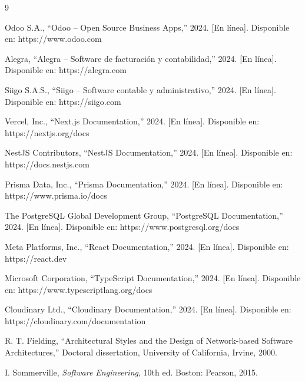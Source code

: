 \documentclass[spanish]{ieee_upb}
\begin{document}
\begin{thebibliography}{9}

	Odoo S.A., ``Odoo -- Open Source Business Apps,'' 2024. [En línea]. Disponible en: https://www.odoo.com

	Alegra, ``Alegra -- Software de facturación y contabilidad,'' 2024. [En línea]. Disponible en: https://alegra.com

	Siigo S.A.S., ``Siigo -- Software contable y administrativo,'' 2024. [En línea]. Disponible en: https://siigo.com

	Vercel, Inc., ``Next.js Documentation,'' 2024. [En línea]. Disponible en: https://nextjs.org/docs

	NestJS Contributors, ``NestJS Documentation,'' 2024. [En línea]. Disponible en: https://docs.nestjs.com

	Prisma Data, Inc., ``Prisma Documentation,'' 2024. [En línea]. Disponible en: https://www.prisma.io/docs

	The PostgreSQL Global Development Group, ``PostgreSQL Documentation,'' 2024. [En línea]. Disponible en: https://www.postgresql.org/docs

	Meta Platforms, Inc., ``React Documentation,'' 2024. [En línea]. Disponible en: https://react.dev

	Microsoft Corporation, ``TypeScript Documentation,'' 2024. [En línea]. Disponible en: https://www.typescriptlang.org/docs

	Cloudinary Ltd., ``Cloudinary Documentation,'' 2024. [En línea]. Disponible en: https://cloudinary.com/documentation

	R. T. Fielding, ``Architectural Styles and the Design of Network-based Software Architectures,'' Doctoral dissertation, University of California, Irvine, 2000.

	I. Sommerville, \textit{Software Engineering}, 10th ed. Boston: Pearson, 2015.

\end{thebibliography}

\end{document}
